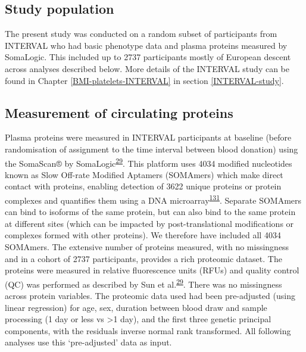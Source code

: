 \documentclass[11pt,twoside]{bristolthesis}
\begin{document}
\hypertarget{study-population-2}{%
\subsection{Study population}\label{study-population-2}}

The present study was conducted on a random subset of participants from INTERVAL who had basic phenotype data and plasma proteins measured by SomaLogic. This included up to 2737 participants mostly of European descent across analyses described below. More details of the INTERVAL study can be found in Chapter \ref{BMI-platelets-INTERVAL} in section \ref{INTERVAL-study}.

\hypertarget{measurement-of-circulating-proteins}{%
\subsection{Measurement of circulating proteins}\label{measurement-of-circulating-proteins}}

Plasma proteins were measured in INTERVAL participants at baseline (before randomisation of assignment to the time interval between blood donation) using the SomaScan® by SomaLogic\textsuperscript{\protect\hyperlink{ref-Sun2018}{29}}. This platform uses 4034 modified nucleotides known as Slow Off-rate Modified Aptamers (SOMAmers) which make direct contact with proteins, enabling detection of 3622 unique proteins or protein complexes and quantifies them using a DNA microarray\textsuperscript{\protect\hyperlink{ref-Rohloff2014}{131}}. Separate SOMAmers can bind to isoforms of the same protein, but can also bind to the same protein at different sites (which can be impacted by post-translational modifications or complexes formed with other proteins). We therefore have included all 4034 SOMAmers. The extensive number of proteins measured, with no missingness and in a cohort of 2737 participants, provides a rich proteomic dataset. The proteins were measured in relative fluorescence units (RFUs) and quality control (QC) was performed as described by Sun et al.\textsuperscript{\protect\hyperlink{ref-Sun2018}{29}}. There was no missingness across protein variables. The proteomic data used had been pre-adjusted (using linear regression) for age, sex, duration between blood draw and sample processing (1 day or less vs \textgreater1 day), and the first three genetic principal components, with the residuals inverse normal rank transformed. All following analyses use this `pre-adjusted' data as input.
\end{document}
